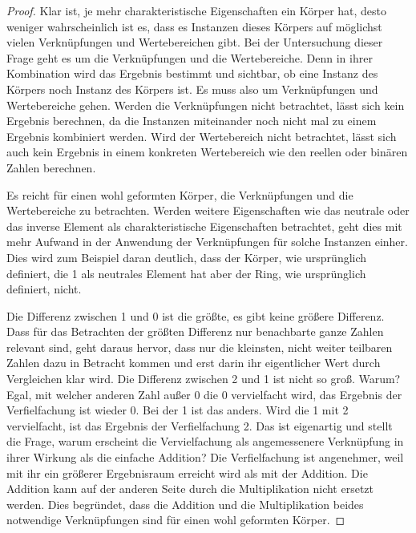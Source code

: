 \documentclass[oneside]{scrbook}
\numberwithin{equation}{section}
\begin{document}
\begin{proof}
	Klar ist, je mehr charakteristische Eigenschaften ein Körper hat, desto weniger wahrscheinlich ist es, dass es Instanzen dieses Körpers auf möglichst vielen Verknüpfungen und Wertebereichen gibt. Bei der Untersuchung dieser Frage geht es um die Verknüpfungen und die Wertebereiche. Denn in ihrer Kombination wird das Ergebnis bestimmt und sichtbar, ob eine Instanz des Körpers noch Instanz des Körpers ist. Es muss also um Verknüpfungen und Wertebereiche gehen. Werden die Verknüpfungen nicht betrachtet, lässt sich kein Ergebnis berechnen, da die Instanzen miteinander noch nicht mal zu einem Ergebnis kombiniert werden. Wird der Wertebereich nicht betrachtet, lässt sich auch kein Ergebnis in einem konkreten Wertebereich wie den reellen oder binären Zahlen berechnen.

	Es reicht für einen wohl geformten Körper, die Verknüpfungen und die Wertebereiche zu betrachten. Werden weitere Eigenschaften wie das neutrale oder das inverse Element als charakteristische Eigenschaften betrachtet, geht dies mit mehr Aufwand in der Anwendung der Verknüpfungen für solche Instanzen einher. Dies wird zum Beispiel daran deutlich, dass der Körper, wie ursprünglich definiert, die 1 als neutrales Element hat aber der Ring, wie ursprünglich definiert, nicht.
	
	Die Differenz zwischen 1 und 0 ist die größte, es gibt keine größere Differenz. Dass für das Betrachten der größten Differenz nur benachbarte ganze Zahlen relevant sind, geht daraus hervor, dass nur die kleinsten, nicht weiter teilbaren Zahlen dazu in Betracht kommen und erst darin ihr eigentlicher Wert durch Vergleichen klar wird. Die Differenz zwischen 2 und 1 ist nicht so groß. Warum? Egal, mit welcher anderen Zahl außer 0 die 0 vervielfacht wird, das Ergebnis der Verfielfachung ist wieder 0. Bei der 1 ist das anders. Wird die 1 mit 2 vervielfacht, ist das Ergebnis der Verfielfachung 2. Das ist eigenartig und stellt die Frage, warum erscheint die Vervielfachung als angemessenere Verknüpfung in ihrer Wirkung als die einfache Addition? Die Verfielfachung ist angenehmer, weil mit ihr ein größerer Ergebnisraum erreicht wird als mit der Addition. Die Addition kann auf der anderen Seite durch die Multiplikation nicht ersetzt werden. Dies begründet, dass die Addition und die Multiplikation beides notwendige Verknüpfungen sind für einen wohl geformten Körper.
\end{proof}
\end{document}
